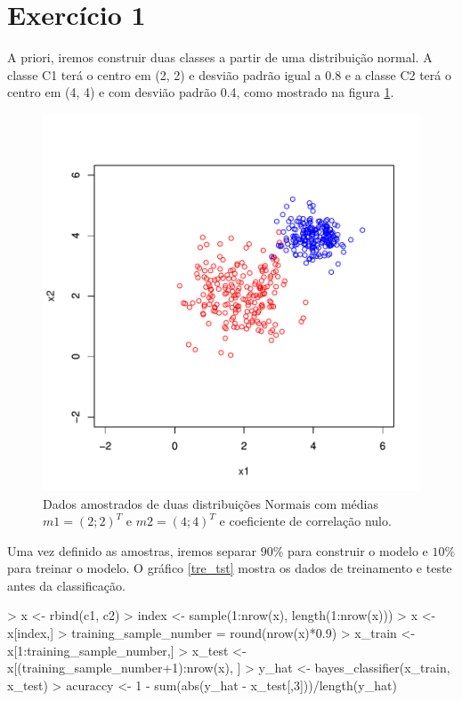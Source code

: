 \documentclass[12pt]{article}
\begin{document}
\section{Exercício 1}

  \par A priori, iremos construir duas classes a partir de uma distribuição normal. A classe C1 terá o centro em (2, 2) e desvião padrão igual a 0.8 e a classe C2 terá o centro em  (4, 4) e com desvião padrão 0.4, como mostrado na figura \ref{ex1}. 
  
\begin{figure}[h]
\centering
\includegraphics{BayesClassifier-004}
\caption{Dados amostrados de duas distribuições Normais com médias $m1 = (2; 2)^T$
e $m2 = (4; 4)^T$ e coeficiente de correlação nulo.}
\label{ex1}
\end{figure}

\par Uma vez definido as amostras, iremos separar $90\%$ para construir o modelo e $10\%$ para treinar o modelo. O gráfico \ref{tre_tst} mostra os dados de treinamento e teste antes da classificação.
  
\begin{Schunk}
\begin{Sinput}
> x <- rbind(c1, c2)
> index <- sample(1:nrow(x), length(1:nrow(x)))
> x <- x[index,]
> training_sample_number = round(nrow(x)*0.9)
> x_train <- x[1:training_sample_number,]
> x_test <- x[(training_sample_number+1):nrow(x), ]
> y_hat <- bayes_classifier(x_train, x_test)
> acuraccy <- 1 - sum(abs(y_hat - x_test[,3]))/length(y_hat)
\end{Sinput}
\end{Schunk}
\end{document}
